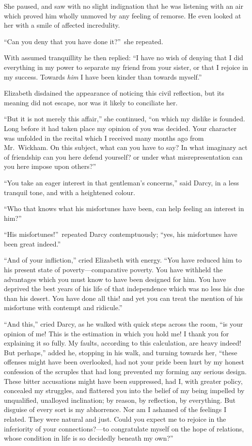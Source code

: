 \documentclass[12pt,english]{book}
\begin{document}
She paused, and saw with no slight indignation that he was listening
with an air which proved him wholly unmoved by any feeling of remorse.
He even looked at her with a smile of affected incredulity.

{}``Can you deny that you have done it?''\ she repeated.

With assumed tranquillity he then replied: {}``I have no wish of
denying that I did everything in my power to separate my friend from
your sister, or that I rejoice in my success. Towards \textit{him}
I have been kinder than towards myself.''

Elizabeth disdained the appearance of noticing this civil reflection,
but its meaning did not escape, nor was it likely to conciliate her.

{}``But it is not merely this affair,'' she continued, {}``on which
my dislike is founded. Long before it had taken place my opinion of
you was decided. Your character was unfolded in the recital which
I received many months ago from Mr.\ Wickham. On this subject, what
can you have to say? In what imaginary act of friendship can you here
defend yourself? or under what misrepresentation can you here impose
upon others?''\ 

{}``You take an eager interest in that gentleman's concerns,'' said
Darcy, in a less tranquil tone, and with a heightened colour.

{}``Who that knows what his misfortunes have been, can help feeling
an interest in him?''\ 

{}``His misfortunes!''\ repeated Darcy contemptuously; {}``yes,
his misfortunes have been great indeed.''

{}``And of your infliction,'' cried Elizabeth with energy. {}``You
have reduced him to his present state of poverty\mbox{---}comparative
poverty. You have withheld the advantages which you must know to have
been designed for him. You have deprived the best years of his life
of that independence which was no less his due than his desert. You
have done all this! and yet you can treat the mention of his misfortune
with contempt and ridicule.''

{}``And this,'' cried Darcy, as he walked with quick steps across
the room, {}``is your opinion of me! This is the estimation in which
you hold me! I thank you for explaining it so fully. My faults, according
to this calculation, are heavy indeed! But perhaps,'' added he, stopping
in his walk, and turning towards her, {}``these offenses might have
been overlooked, had not your pride been hurt by my honest confession
of the scruples that had long prevented my forming any serious design.
These bitter accusations might have been suppressed, had I, with greater
policy, concealed my struggles, and flattered you into the belief
of my being impelled by unqualified, unalloyed inclination; by reason,
by reflection, by everything. But disguise of every sort is my abhorrence.
Nor am I ashamed of the feelings I related. They were natural and
just. Could you expect me to rejoice in the inferiority of your connections?\mbox{---}to
congratulate myself on the hope of relations, whose condition in life
is so decidedly beneath my own?''\ 
\end{document}
